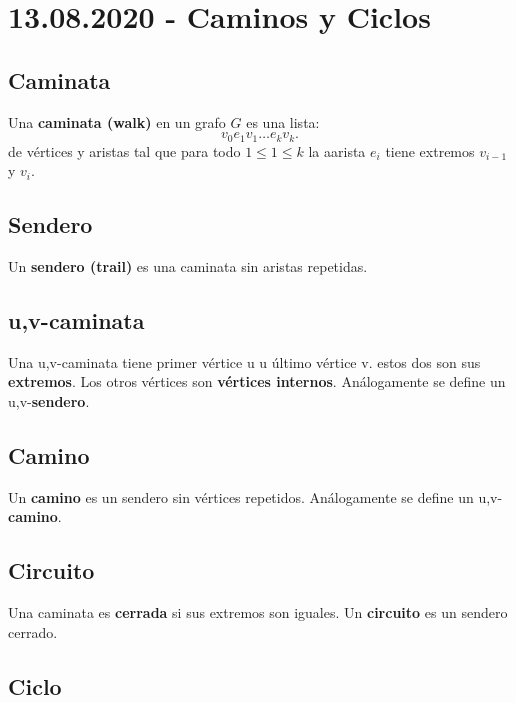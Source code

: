 \documentclass[a4paper]{book}
\begin{document}
\section{13.08.2020 - Caminos y Ciclos}
\label{sec:caminos_y_ciclos}

\subsection{Caminata}
\label{ssec:caminata}

Una \textbf{caminata (walk)} en un grafo \(G\) es una lista:
\[
v_0e_1v_{1}\ldots e_{k}v_{k}
.\]
 de vértices y aristas tal que para todo \(1\le 1 \le k\) la aarista \(e_{i}\)
 tiene extremos \(v_{i-1}\) y \(v_{i}\).

\subsection{Sendero}
\label{ssec:sendero}

Un \textbf{sendero (trail)} es una caminata sin aristas repetidas.

\subsection{u,v-caminata}
\label{ssec:u_v_caminata}

Una u,v-caminata tiene primer vértice u u último vértice v. estos dos son sus
\textbf{extremos}. Los otros vértices son \textbf{vértices internos}.
Análogamente se define un u,v-\textbf{sendero}.

\subsection{Camino}
\label{ssec:camino}

Un \textbf{camino} es un sendero sin vértices repetidos. Análogamente se define
un u,v-\textbf{camino}.

\subsection{Circuito}
\label{ssec:circuito}

Una caminata es \textbf{cerrada} si sus extremos son iguales. Un \textbf{circuito} es un sendero cerrado.

\subsection{Ciclo}
\label{ssec:ciclo}
\end{document}
